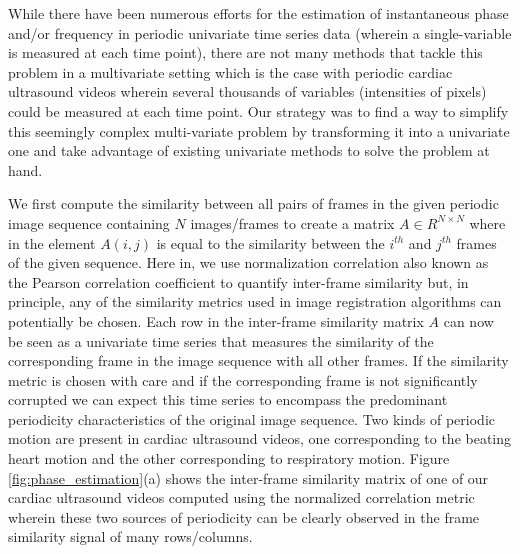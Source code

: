\documentclass[runningheads,a4paper]{llncs}
\begin{document}
%
While there have been numerous efforts for the estimation of instantaneous phase and/or frequency in periodic univariate time series data (wherein a single-variable is measured at each time point)\cite{Boashash1992,Lu2013,Luo2003}, there are not many methods that tackle this problem in a multivariate setting which is the case with periodic cardiac ultrasound videos wherein several thousands of variables (intensities of pixels) could be measured at each time point. Our strategy was to find a way to simplify this seemingly complex multi-variate problem by transforming it into a univariate one and take advantage of existing univariate methods to solve the problem at hand. 

	We first compute the similarity between all pairs of frames in the given periodic image sequence containing $N$ images/frames to create a matrix $A \in R^{N \times N}$ where in the element $A(i,j)$ is equal to the similarity between the $i^{th}$ and $j^{th}$ frames of the given sequence. Here in, we use normalization correlation also known as the Pearson correlation coefficient to quantify inter-frame similarity but, in principle, any of the similarity metrics used in image registration algorithms \cite{Goshtasby2012} can potentially be chosen. Each row in the inter-frame similarity matrix $A$ can now be seen as a univariate time series that measures the similarity of the corresponding frame in the image sequence with all other frames.
If the similarity metric is chosen with care and if the corresponding frame is not significantly corrupted we can expect this time series to encompass the
predominant periodicity characteristics of the original image sequence. Two kinds of periodic motion are present in cardiac ultrasound videos, one corresponding to the beating heart motion and the other corresponding to respiratory motion. Figure \ref{fig:phase_estimation}(a) shows the inter-frame similarity matrix of one of our cardiac ultrasound videos computed using the normalized correlation metric wherein these two sources of periodicity can be clearly observed in the frame similarity signal of many rows/columns. 
\end{document}
